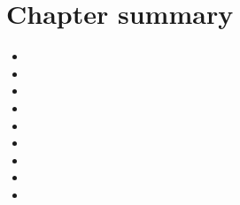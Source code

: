 \documentclass[a4paper,10pt,twoside]{book}
\begin{document}
\section{Chapter summary}

\begin{itemize}
  \item 
  \item 
  \item 
  \item 
  \item 
  \item 
  \item 
  \item 
  \item 
\end{itemize}


\ifx\wholebook\relax\else 
   
   
\end{document}
